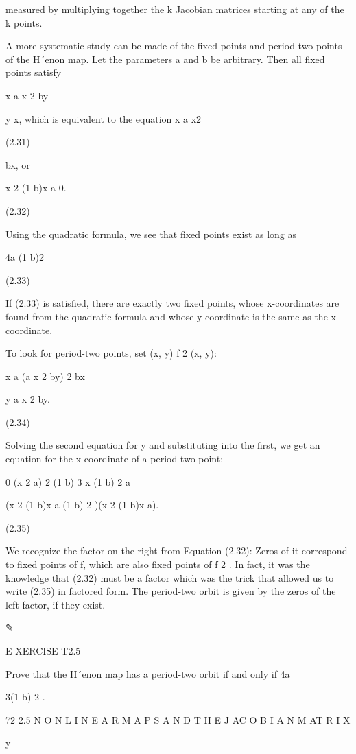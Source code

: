 \documentclass[12pt]{article}
\begin{document}
measured by multiplying together the k Jacobian matrices starting at any of the k points.

A more systematic study can be made of the ﬁxed points and period-two points of the H´enon map. Let the parameters a and b be 
arbitrary. Then all ﬁxed points satisfy

x  a  x 2  by

y  x, which is equivalent to the equation x  a  x2 

(2.31)

 bx, or

x 2  (1  b)x  a  0.

(2.32)

Using the quadratic formula, we see that ﬁxed points exist as long as

4a  (1  b)2 

(2.33)

If (2.33) is satisﬁed, there are exactly two ﬁxed points, whose x-coordinates are found from the quadratic formula and whose 
y-coordinate is the same as the x-coordinate.

To look for period-two points, set (x, y)  f 2 (x, y):

x  a  (a  x 2  by) 2  bx

y  a  x 2  by.

(2.34)

Solving the second equation for y and substituting into the ﬁrst, we get an equation for the x-coordinate of a period-two point:

0  (x 2  a) 2  (1  b) 3 x  (1  b) 2 a

 (x 2  (1  b)x  a  (1  b) 2 )(x 2  (1  b)x  a).

(2.35)

We recognize the factor on the right from Equation (2.32): Zeros of it correspond to ﬁxed points of f, which are also ﬁxed points 
of f 2 . In fact, it was the knowledge that (2.32) must be a factor which was the trick that allowed us to write (2.35) in factored 
form. The period-two orbit is given by the zeros of the left factor, if they exist.

✎

E XERCISE T2.5

Prove that the H´enon map has a period-two orbit if and only if 4a

3(1  b) 2 .



72 2.5 N O N L I N E A R M A P S A N D T H E J AC O B I A N M AT R I X

y
\end{document}
